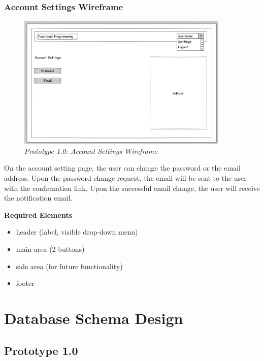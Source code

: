 \documentclass[12pt,twoside,a4paper]{report}
\begin{document}
\subsubsection{Account Settings Wireframe}\label{3.7.1.3}
\begin{figure}[!ht]
	\centering
		\includegraphics[width=0.9\textwidth, totalheight=7cm]
		{wireframe_account_settings}
	\caption{\textit{Prototype 1.0: Account Settings Wireframe}}
	\label{f3.7.1.3}
\end{figure}

On the account setting page, the user can change the password or the email address. Upon the password change request, the email will be sent to the user with the confirmation link. Upon the successful email change, the user will receive the notification email.

\textbf{Required Elements}
\begin{itemize}
\item header (label, visible drop-down menu)
\item main area (2 buttons)
\item side area (for future functionality)
\item footer
\end{itemize}

\section{Database Schema Design}\label{3.8}

\subsection{Prototype 1.0}\label{3.8.1}
\end{document}
